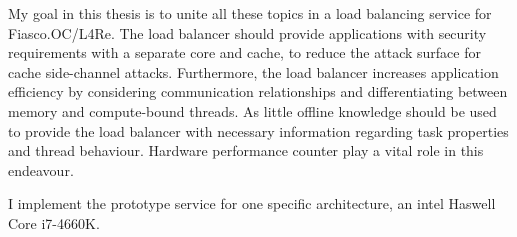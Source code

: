 My goal in this thesis is to unite all these topics in a load balancing
service for Fiasco.OC/L4Re.
The load balancer should provide applications with security requirements with
a separate core and cache, to reduce the attack surface for cache side-channel
attacks.
Furthermore, the load balancer increases application efficiency by considering 
communication relationships and differentiating between memory and 
compute-bound threads.
As little offline knowledge should be used to provide the load balancer with
necessary information regarding task properties and thread behaviour.
Hardware performance counter play a vital role in this endeavour.

I implement the prototype service for one specific architecture, an \gls{intel}
Haswell Core i7-4660K.


\begin{comment}

\begin{itemize}
  \item introduction to relevant terminology
  \item SMT, symbiotic scheduling, co-schedule, measurement difficulties
  \item Congestion awareness of shared resources; Goal minimal slowdown for all
    applications; fairness, cache weights, pain metric, reliance on default
    scheduler, performance counters
  \item communication awareness: compute-communicate cycle, distribution of one
    application
  \item don't haves: No CMP architecture -> SMT-SMP combination; client server
    communication model;
  \item Fiasco.OC: no logic, just mechanisms in the kernel, hence no balancing;
  \item L4Re: no automatic, behaviour based balancing.
  \item do: communication models: HPC, CL-SVR; behaviour analysis: perf
    counters; SMT-SMP processor awareness, reduced conflicts in shared hardware
    resources, only on-line measurements;
  \item secure/real-time/exclusive core design.
\end{itemize}


\begin{itemize}
  \item Current processor architectures don't use CMP processors any more, therefore
    the cache layout is different. My work evaluates the research results on the
    new HW layout. But AMD Opteron Barcelona had a similar cache layout.
  \item User level scheduling on a $µ$-kernel. But user level scheduling was
    done before.
  \item More scheduling parameters \textit{or} less assumptions about threads.
  \item No off-line measurements, only on-line information gathering.
  \item Thread interaction possible (communication partner, security flag)
  \item Designated cores for security critical applications.
\end{itemize}

\end{comment}

